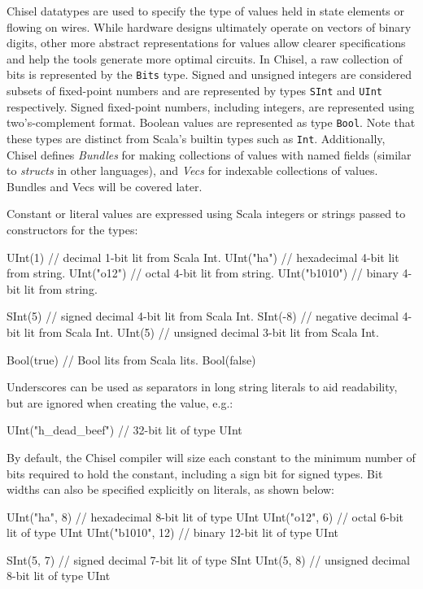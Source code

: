\documentclass[twocolumn,10pt]{article}
\def\code#1{{\tt #1}}
\begin{document}
Chisel datatypes are used to specify the type of values held in state
elements or flowing on wires.  While hardware designs ultimately
operate on vectors of binary digits, other more abstract
representations for values allow clearer specifications and help the
tools generate more optimal circuits.  In Chisel, a raw collection of
bits is represented by the \code{Bits} type.  Signed and unsigned integers
are considered subsets of fixed-point numbers and are represented by
types \code{SInt} and \code{UInt} respectively. Signed fixed-point
numbers, including integers, are represented using two's-complement
format.  Boolean values are represented as type \code{Bool}.  Note
that these types are distinct from Scala's builtin types such as
\code{Int}.  Additionally, Chisel defines {\em Bundles} for making
collections of values with named fields (similar to {\em structs} in
other languages), and {\em Vecs} for indexable collections of
values.  Bundles and Vecs will be covered later.

Constant or literal values are expressed using Scala integers or
strings passed to constructors for the types:
\begin{scala}
UInt(1)       // decimal 1-bit lit from Scala Int.
UInt("ha")    // hexadecimal 4-bit lit from string.
UInt("o12")   // octal 4-bit lit from string.
UInt("b1010") // binary 4-bit lit from string.

SInt(5)    // signed decimal 4-bit lit from Scala Int.
SInt(-8)   // negative decimal 4-bit lit from Scala Int.
UInt(5)    // unsigned decimal 3-bit lit from Scala Int.

Bool(true) // Bool lits from Scala lits.
Bool(false)
\end{scala}

Underscores can be used as separators in long string literals to aid
readability, but are ignored when creating the value, e.g.:
\begin{scala}
UInt("h_dead_beef")   // 32-bit lit of type UInt
\end{scala}

By default, the Chisel compiler will size each constant to the minimum
number of bits required to hold the constant, including a sign bit for
signed types.  Bit widths can also be specified explicitly on
literals, as shown below:
\begin{scala}
UInt("ha", 8)     // hexadecimal 8-bit lit of type UInt
UInt("o12", 6)    // octal 6-bit lit of type UInt
UInt("b1010", 12) // binary 12-bit lit of type UInt

SInt(5, 7) // signed decimal 7-bit lit of type SInt
UInt(5, 8) // unsigned decimal 8-bit lit of type UInt
\end{scala}
\end{document}
